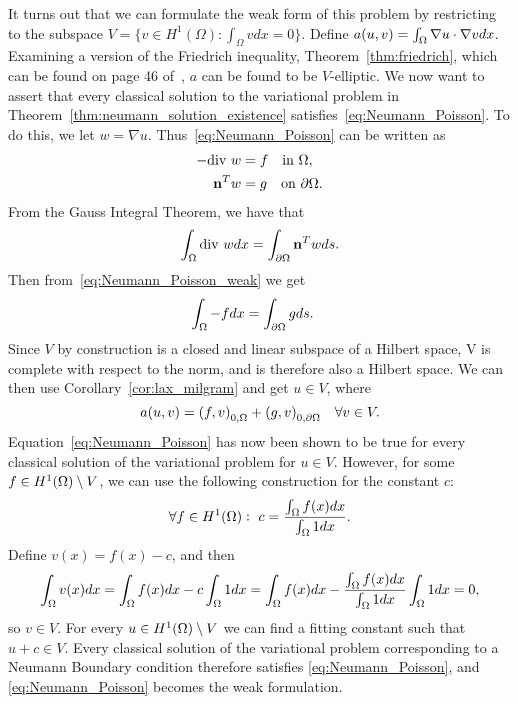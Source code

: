 It turns out that we can formulate the weak form of this problem by restricting to the subspace $V=\{v\in H^1(\Omega):\int_{\Omega}vdx=0\}$.
Define $a(u,v) = \int_\Omega \nabla u \cdot \nabla v dx$. Examining a version of 
the Friedrich inequality, Theorem~\ref{thm:friedrich}, which can be found on 
page 46 of~\cite{Braess}, $a$ can be found to be $V$-elliptic.
We now want to assert that every classical solution to the variational problem in Theorem~\ref{thm:neumann_solution_existence} satisfies~\eqref{eq:Neumann_Poisson}.
To do this, we let $w=\nabla u$. Thus~\eqref{eq:Neumann_Poisson} can be written as
\begin{align}\label{eq:Neumann_Poisson_weak}
\begin{split}
    -\text{div } w &= f \quad \text{in } \Omega, \\
    \mathbf{n}^T w &= g \quad \text{on } \partial \Omega.
\end{split}    
\end{align}
From the Gauss Integral Theorem, we have that
\[\int_{\Omega} \text{div } w dx = \int_{\partial \Omega} \mathbf{n}^T w ds.\]
Then from~\eqref{eq:Neumann_Poisson_weak} we get
\begin{align}
\begin{split}
\int_{\Omega} -f dx &= \int_{\partial \Omega} g ds.
\end{split}
\end{align}
Since $V$ by construction is a closed and linear subspace of a Hilbert space, 
V is complete with respect to the norm, and is therefore also a Hilbert space. 
We can then use Corollary~\ref{cor:lax_milgram} 
 and get $u\in V$, where %
\begin{equation}\label{eq:Lax-Milgram_Neumann}
  a(u,v) = {(f,v)}_{0,\Omega} + {(g,v)}_{0,\partial \Omega} \quad \forall v\in V.  
\end{equation}
Equation~\eqref{eq:Neumann_Poisson} has now been shown to be true for 
every classical solution of the variational problem for $u\in V$. However, for some 
$f\in H^1(\Omega)\setminus V$, we can use the following construction for 
the constant $c$:
\begin{equation*}
    \forall f \in H^1(\Omega): \,\, c = \frac{\int_\Omega f(x) dx }{\int_\Omega 1 dx}.
\end{equation*}
Define $v(x) = f(x) - c$, and then 
\begin{equation*}
    \int_\Omega v(x)dx = \int_\Omega f(x) dx - c\int_\Omega 1 dx = \int_\Omega f(x) dx - \frac{\int_\Omega f(x) dx }{\int_\Omega 1 dx} \int_\Omega 1 dx = 0,
\end{equation*}
so $v \in V$. For every $u\in H^1(\Omega)\setminus V$ we can find a fitting 
constant such that $u+c \in V$. Every classical solution of the 
variational problem corresponding to a Neumann Boundary condition therefore 
satisfies \eqref{eq:Neumann_Poisson}, and \eqref{eq:Neumann_Poisson} becomes the weak formulation.